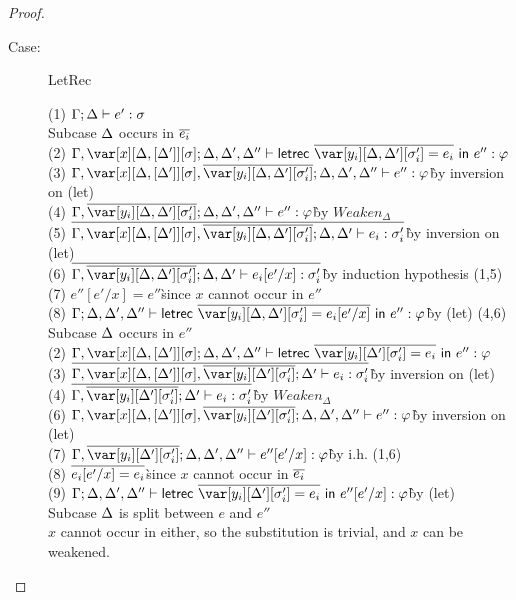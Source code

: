 \begin{proof}
\begin{description}
\item[Case:] LetRec
\begin{tabbing}
    (1) $\Gamma; \Delta \vdash e' : \sigma$\\
    Subcase $\Delta$ occurs in $\overline{e_i}$\\
    (2) $\G,\xD; \D, \D', \D'' \vdash \lletrec{\ov{\var[y_i][\D,\D'][\s_i'] = e_i}}{e''} : \vp$\\
    (3) $\G,\xD,\ov{\var[y_i][\D,\D'][\s'_i]}; \D,\D',\D'' \vdash e'' : \vp$\` by inversion on (let)\\
    (4) $\G,\ov{\var[y_i][\D,\D'][\s'_i]}; \D,\D',\D'' \vdash e'' : \vp$\` by $Weaken_\Delta$\\
    (5) $\ov{\G,\xD,\ov{\var[y_i][\D,\D'][\s'_i]}; \D, \D' \vdash e_i : \s'_i}$\` by inversion on (let)\\
    (6) $\ov{\G,\ov{\var[y_i][\D,\D'][\s'_i]}; \D,\D' \vdash e_i[e'/x] : \s'_i}$\` by induction hypothesis (1,5)\\
    (7) $e''[e'/x] = e''$\` since $x$ cannot occur in $e''$\\
    (8) $\G; \D,\D',\D'' \vdash \lletrec{\ov{\var[y_i][\D,\D'][\s_i'] = e_i[e'/x]}}{e''} : \vp$\` by (let) (4,6)\\
    Subcase $\Delta$ occurs in $e''$\\
    (2) $\G, \xD; \D, \D', \D'' \vdash \lletrec{\ov{\var[y_i][\D'][\s_i'] = e_i}}{e''} : \vp$\\
    (3) $\ov{\G,\xD,\ov{\var[y_i][\D'][\s'_i]}; \D' \vdash e_i : \s'_i}$\` by inversion on (let)\\
    (4) $\ov{\G,\ov{\var[y_i][\D'][\s'_i]}; \D' \vdash e_i : \s'_i}$\` by $Weaken_\Delta$\\
    (6) $\G,\xD,\ov{\var[y_i][\D'][\s'_i]}; \D,\D',\D'' \vdash e'' : \vp$\` by inversion on (let)\\
    (7) $\G,\ov{\var[y_i][\D'][\s'_i]}; \D,\D',\D'' \vdash e''[e'/x] : \vp$\` by i.h. (1,6)\\
    (8) $\overline{e_i[e'/x] = e_i}$\` since $x$ cannot occur in $\overline{e_i}$\\
    (9) $\G;\D,\D',\D'' \vdash \lletrec{\ov{\var[y_i][\D'][\s'_i] = e_i}}{e''[e'/x]} : \vp$\` by (let)\\
    Subcase $\Delta$ is split between $e$ and $e''$\\
    $x$ cannot occur in either, so the substitution is trivial, and $x$ can be weakened.
\end{tabbing}


\end{description}
\end{proof}
